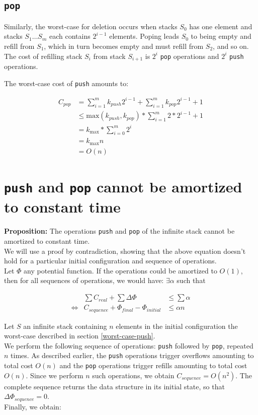   \subsection{\texttt{pop}}
  Similarly, the worst-case for deletion occurs when stacks $S_0$ has one element and stacks $S_1\ldots S_m$ each contains $2^{i-1}$ elements. Poping leads $S_0$ to being empty and refill from $S_1$, which in turn becomes empty and must refill from $S_2$, and so on. The cost of refilling stack $S_i$ from stack $S_{i+1}$ is $2^i$ \texttt{pop} operations and $2^i$ \texttt{push} operations.

  The worst-case cost of \texttt{push} amounts to:

  \[
  \begin{array}{ll}
    C_{pop} & = \sum_{i=1}^m k_{push} 2^{i-1} + \sum_{i=1}^m k_{pop} 2^{i-1} + 1\\
            & \leq \text{max}(k_{push}, k_{pop}) * \sum_{i=1}^m 2 * 2^{i-1} + 1\\
            & = k_{\text{max}} * \sum_{i=0}^m 2^{i}\\
            & = k_{\text{max}} n\\
            & = O(n)
  \end{array}
  \]

\section{\texttt{push} and \texttt{pop} cannot be amortized to constant time}

\textbf{Proposition:} The operations \texttt{push} and \texttt{pop} of the infinite stack cannot be amortized to constant time.\\

We will use a proof by contradiction, showing that the above equation doesn't hold for a particular initial configuration and sequence of operations.\\
Let $\Phi$ any potential function. If the operations could be amortized to $O(1)$, then for all sequences of operations, we would have: $\exists \alpha$ such that

\[
\begin{array}{lrcl}
  & \sum C_{real} + \sum \Delta\Phi & \leq \sum \alpha \\
  \iff & C_{sequence} + \Phi_{final} - \Phi_{initial} & \leq \alpha n
\end{array}
\]

Let $S$ an infinite stack containing $n$ elements in the initial configuration the worst-case described in section \ref{worst-case-push}.\\
We perform the following sequence of operations: \texttt{push} followed by \texttt{pop}, repeated $n$ times. As described earlier, the \texttt{push} operations trigger overflows amounting to total cost $O(n)$ and the \texttt{pop} operations trigger refills amounting to total cost $O(n)$. Since we perform $n$ such operations, we obtain $C_{sequence} = O(n^2)$. The complete sequence returns the data structure in its initial state, so that $\Delta\Phi_{sequence} = 0$.\\
Finally, we obtain:

